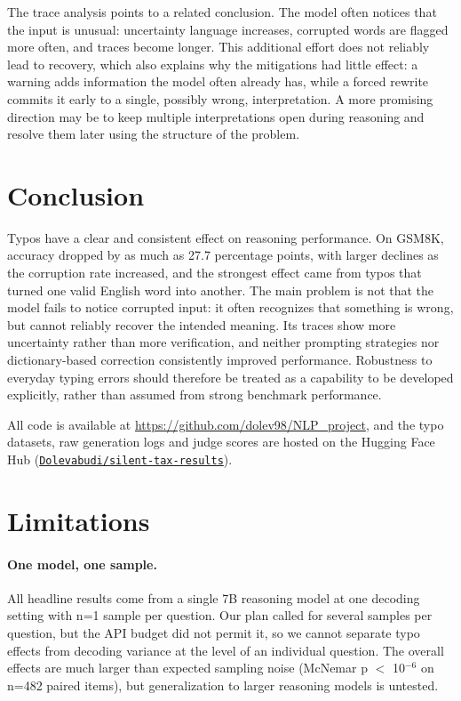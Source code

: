 \documentclass[11pt]{article}
\begin{document}
The trace analysis points to a related conclusion. The model often notices that the input is unusual: uncertainty language increases, corrupted words are flagged more often, and traces become longer. This additional effort does not reliably lead to recovery, which also explains why the mitigations had little effect: a warning adds information the model often already has, while a forced rewrite commits it early to a single, possibly wrong, interpretation. A more promising direction may be to keep multiple interpretations open during reasoning and resolve them later using the structure of the problem.


\section{Conclusion}

Typos have a clear and consistent effect on reasoning performance. On GSM8K, accuracy dropped by as much as 27.7 percentage points, with larger declines as the corruption rate increased, and the strongest effect came from typos that turned one valid English word into another. The main problem is not that the model fails to notice corrupted input: it often recognizes that something is wrong, but cannot reliably recover the intended meaning. Its traces show more uncertainty rather than more verification, and neither prompting strategies nor dictionary-based correction consistently improved performance. Robustness to everyday typing errors should therefore be treated as a capability to be developed explicitly, rather than assumed from strong benchmark performance.

All code is available at \url{https://github.com/dolev98/NLP_project}, and the typo datasets, raw generation logs and judge scores are hosted on the Hugging Face Hub (\href{https://huggingface.co/datasets/Dolevabudi/silent-tax-results}{\nolinkurl{Dolevabudi/silent-tax-results}}).


\section*{Limitations}

\paragraph{One model, one sample.} All headline results come from a single 7B reasoning model at one decoding setting with n=1 sample per question. Our plan called for several samples per question, but the API budget did not permit it, so we cannot separate typo effects from decoding variance at the level of an individual question. The overall effects are much larger than expected sampling noise (McNemar p $<$ 10$^{-6}$ on n=482 paired items), but generalization to larger reasoning models is untested.
\end{document}

